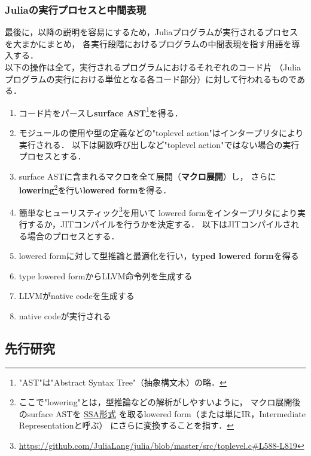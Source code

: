 \subsubsection{Juliaの実行プロセスと中間表現} \label{subsubsection:eval-process}

最後に，以降の説明を容易にするため，Juliaプログラムが実行されるプロセスを大まかにまとめ，
各実行段階におけるプログラムの中間表現を指す用語を導入する\cite{eval-of-julia-code, julia-asts}．\\

以下の操作は全て，実行されるプログラムにおけるそれぞれのコード片
（Juliaプログラムの実行における単位となる各コード部分）に対して行われるものである．

\begin{enumerate}
  \item コード片をパースし\textbf{surface AST}\footnote{
          "AST"は"Abstract Syntax Tree"（抽象構文木）の略．
        }を得る．
  \item モジュールの使用や型の定義などの"toplevel action"はインタープリタにより実行される．
        以下は関数呼び出しなど"toplevel action"ではない場合の実行プロセスとする．
  \item surface ASTに含まれるマクロを全て展開（\textbf{マクロ展開}）し，
        さらに\textbf{lowering}\footnote{
          ここで"lowering"とは，型推論などの解析がしやすいように，
          マクロ展開後のsurface ASTを
          \href{https://docs.julialang.org/en/latest/devdocs/ssair/}{SSA形式}
          を取るlowered form（または単にIR，Intermediate Representationと呼ぶ）
          にさらに変換することを指す．
        }を行い\textbf{lowered form}を得る．
  \item 簡単なヒューリスティック\footnote{
          \url{https://github.com/JuliaLang/julia/blob/master/src/toplevel.c\#L588-L819}
        }を用いて
        lowered formをインタープリタにより実行するか，JITコンパイルを行うかを決定する．
        以下はJITコンパイルされる場合のプロセスとする．
  \item lowered formに対して型推論と最適化を行い，\textbf{typed lowered form}を得る
  \item type lowered formからLLVM命令列を生成する
  \item LLVMがnative codeを生成する
  \item native codeが実行される
\end{enumerate}

\subsection{先行研究}

